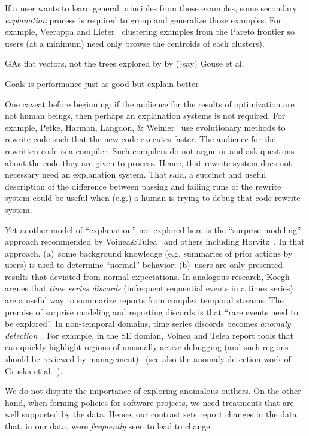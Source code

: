 \documentclass[runningheads]{llncs}
\begin{document}
{If a user wants to learn general principles from those examples,
some secondary {\em explanation} process is required to group and generalize those
examples.
For example,  Veerappa and Lieter~\cite{veerappa11} clustering examples from the Pareto
frontier so users (at a minimum) need only browse the centroids of each clusters).



GAs flat vectors, not the trees explored by by ()say) Gouse et al.

Goals is performance just as good but explain better

One caveat before beginning: if the audience for the
results of optimization are not human beings, then
perhaps an explanation systems is not required. For
example, Petke, Harman, Langdon, \&
Weimer~\cite{petke14} use evolutionary methods to
rewrite code such that the new code executes
faster. The audience for the rewritten code is a
compiler. Such compilers do not argue or and ask
questions about the code they are given to process.
Hence, that rewrite system does not necessary need
an explanation system.  That said, a succinct and
useful description of the difference between passing
and failing runs of the rewrite system could be
useful when (e.g.) a human is trying to debug that
code rewrite system.

Yet another model of ``explanation'' not explored
here is the ``surprise modeling'' approach
recommended by Voinea\&Tulea~\cite{voinea07} and
others including Horvitz~\cite{horvitz05}. In that
approach, (a)~some background knowledge
(e.g. summaries of prior actions by users) is used
to determine ``normal'' behavior; (b)~users are only
presented results that deviated from normal
expectations. In analogous research,
Koegh~\cite{keogh05} argues that {\em time series
  discords} (infrequent sequential events in a times
series) are a useful way to summarize reports from
complex temporal streams. The premise of surprise
modeling and reporting discords is that ``rare
events need to be explored''.  
In non-temporal domains, time series discords becomes
{\em anomaly detection}~\cite{chandola09}. For example, in the SE domian,
Voinea and Telea report tools that can quickly highlight regions
of unusually active debugging (and such regions should be reviewed
by management)~\cite{voiena07} (see also the anomaly
detection work of Gruska et al.~\cite{gruska10}).

We do not dispute the
importance of exploring anomalous outliers.  On the other
hand, when forming policies for software projects,
we need treatments that are well supported by the
data. Hence, our contrast sets report changes in the
data that, in our data, were {\em frequently} seen to
lead to change. 

}
\end{document}

